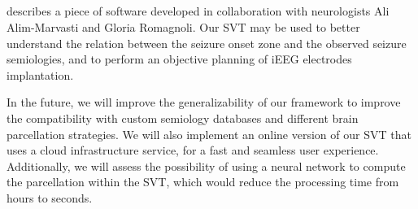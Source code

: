 \subsection{}

 describes a piece of software developed in collaboration with neurologists Ali Alim-Marvasti and Gloria Romagnoli.
Our \ac{SVT} may be used to better understand the relation between the seizure onset zone and the observed seizure semiologies, and to perform an objective planning of \ac{iEEG} electrodes implantation.

In the future, we will improve the generalizability of our framework to improve the compatibility with custom semiology databases and different brain parcellation strategies.
We will also implement an online version of our \ac{SVT} that uses a cloud infrastructure service, for a fast and seamless user experience.
Additionally, we will assess the possibility of using a neural network to compute the parcellation within the \ac{SVT}, which would reduce the processing time from hours to seconds.


\subsection{}

